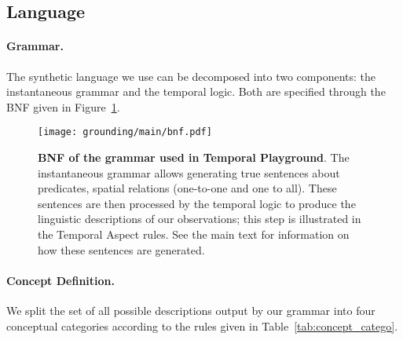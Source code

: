 \newpage
\subsection{Language} \label{sup:grammar}

\paragraph{Grammar. }
The synthetic language we use can be decomposed into two components: the instantaneous grammar and the temporal logic. Both are specified through the BNF given in Figure~\ref{fig:insta-gram}.

\begin{figure}[h]
\centering
\texttt{[image: grounding/main/bnf.pdf]}
\caption{\textbf{BNF of the grammar used in Temporal Playground}. The instantaneous grammar allows generating true sentences about predicates, spatial relations (one-to-one and one to all). These sentences are then processed by the temporal logic to produce the linguistic descriptions of our observations; this step is illustrated in the Temporal Aspect rules. See the main text for information on how these sentences are generated.}
\label{fig:insta-gram}
\end{figure}

\paragraph{Concept Definition. } We split the set of all possible descriptions output by our grammar into four conceptual categories according to the rules given in Table~\ref{tab:concept_catego}.

